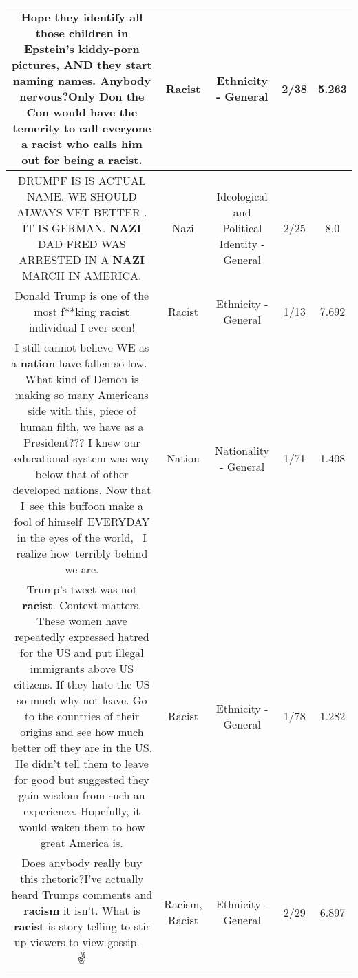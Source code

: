 \documentclass[11pt]{article}
\newlength\mylength
\begin{document}
\begin{center}
\begin{longtable}{|C{.65\mylength}|C{.30\mylength}|C{.12\mylength}|C{.12\mylength}|C{.12\mylength}|}
  \small Hope they identify all those children in Epstein's kiddy-porn pictures, AND they start naming names. Anybody nervous?Only Don the Con would have the temerity to call everyone a \textbf{racist} who calls him out for being a \textbf{racist}.\normalsize   & Racist & Ethnicity - General & 2/38 & 5.263 \\  \hline
  \small DRUMPF IS IS ACTUAL NAME.  WE SHOULD ALWAYS VET BETTER .  IT IS GERMAN.  \textbf{NAZI} DAD FRED WAS ARRESTED IN A \textbf{NAZI} MARCH IN AMERICA.\normalsize   & Nazi &  Ideological and Political Identity - General & 2/25 & 8.0 \\  \hline
  \small Donald Trump is one of the most f**king \textbf{racist} individual I ever seen!\normalsize   & Racist & Ethnicity - General & 1/13 & 7.692 \\  \hline
  \small I still cannot believe WE as a \textbf{nation} have fallen so low.  What kind of Demon is making so many Americans side with this, piece of human filth, we have as a President??? I knew our educational system was way below that of other developed nations. Now that I see this buffoon make a fool of himself EVERYDAY in the eyes of the world,  I realize how terribly behind we are.\normalsize   & Nation & Nationality - General & 1/71 & 1.408 \\  \hline
  \small Trump's tweet was not \textbf{racist}. Context matters. These women have repeatedly expressed hatred for the US and put illegal immigrants above US citizens. If they hate the US so much why not leave. Go to the countries of their origins and see how much better off they are in the US. He didn't tell them to leave for good but suggested they gain wisdom from such an experience. Hopefully, it would waken them to how great America is.\normalsize   & Racist & Ethnicity - General & 1/78 & 1.282 \\  \hline
  \small Does anybody really buy this rhetoric?I've actually heard Trumps comments and \textbf{racism} it isn't. What is \textbf{racist} is story telling to stir up viewers to view gossip. 🙏🔑✌️\normalsize   & Racism, Racist & Ethnicity - General & 2/29 & 6.897 \\  \hline

\end{longtable}
\end{center}
\end{document}

